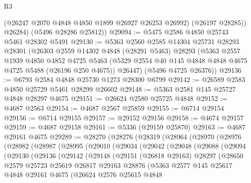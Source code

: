 \begin{lexlean}{R3}
\begin{coremodule}
          (@26247 @2070 @4848 @4850 @1899 @26927 @26253 @26992)
          (@26197 @28285))
        @26284)
      (@5496 @28286 @25812))
@29094 := @5475 @2586 @4850 @25743 @5461 @28302 @5491
@29130 := @5363
    @2560
    @2585
    @14304
    @25731
    @28293
    @28301
    (@26303
      @2559
      @14302
      @4848
      (@28291 @5463)
      @28293
      (@5363
        @2557
        @1939
        @4850
        @4852
        @4725
        @5463
        (@5329 @2554 @40 @145 @4848 @4848 @4675 @4725 @5488 (@26196 @250 @4675))
        @26447)
      (@5496 @4725 @26376))
@29136 := @6793 @2584 @4848 @25730 @1273 @28300 @6799
@29142 := @26589 @2583 @4850 @25729 @5461 @28299 @26602
@29148 := @5363 @2581 @145 @25727 @4848 @28297 @4675
@29151 := @26624 @2580 @25725 @4848
@29152 := @4687 @2563
@29154 := @4687 @2567 @25859
@29155 := @6714 @29154
@29156 := @6714 @29155
@29157 := @29152 @29156
@29158 := @4674 @29157
@29159 := @4687 @29158
@29161 := @5336 (@29159 @25870)
@29163 := @4687 @29161 @4675
@29289 := @28270
    (@28276
      (@28319
        (@28964
          (@28970
            (@28976
              (@28982
                (@28987
                  (@28995
                    (@29010
                      (@29034
                        (@29042
                          (@29048
                            (@29088
                              (@29094
                                (@29130
                                  (@29136
                                    (@29142
                                      (@29148
                                        (@29151
                                          (@26818 @29163)
                                          @28297
                                          (@28650
                                            @2579
                                            @25723
                                            @25619
                                            @26817
                                            @29163
                                            @28876
                                            (@5363
                                              @2577
                                              @145
                                              @25617
                                              @4848
                                              @29161
                                              @4675
                                              (@26624
                                                @2576
                                                @25615
                                                @4848

\end{coremodule}
\end{lexlean}
